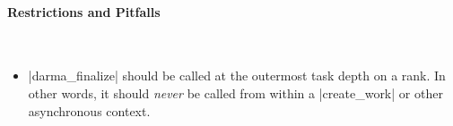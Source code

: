 \paragraph{Restrictions and Pitfalls}\mbox{} \\
\begin{itemize}
  \item |darma_finalize| should be called at the outermost task depth on
  a rank.  In other words, it should {\it never} be called from within a
  |create_work| or other asynchronous context.
\end{itemize}




